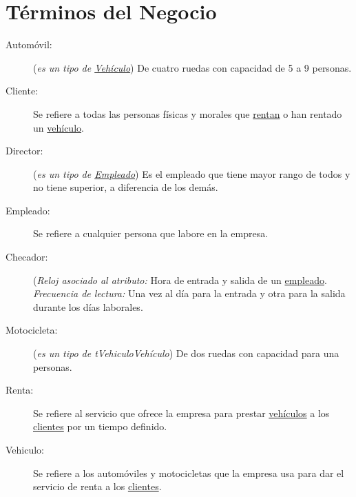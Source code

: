 \section{Términos del Negocio}
\label{sec:terminosDeNegocio}

	
\begin{description}
	\item[\hypertarget{tAutomovil}{Automóvil:}] ({\em es un tipo de \hyperlink{tVehiculo}{Vehículo}}) De cuatro ruedas con capacidad de 5 a 9 personas. 
	\item[\hypertarget{tCliente}{Cliente:}] Se refiere a todas las personas físicas y morales que \hyperlink{tRenta}{rentan} o han rentado un \hyperlink{tVehiculo}{vehículo}.
	
	\item[\hypertarget{tDirector}{Director:}] ({\em es un tipo de \hyperlink{tEmpleado}{Empleado}}) Es el empleado que tiene mayor rango de todos y no tiene superior, a diferencia de los demás.	
	\item[\hypertarget{tEmpleado}{Empleado:}] Se refiere a cualquier persona que labore en la empresa.
	
	\item[\hypertarget{tChecador}{Checador:}] ({\em Reloj asociado al atributo:} Hora de entrada y salida de un \hyperlink{tEmpleado}{empleado}. {\em Frecuencia de lectura:} Una vez al día para la entrada y otra para la salida durante los días laborales.
	
	\item[\hypertarget{tMotocicleta}{Motocicleta:}] ({\em es un tipo de {tVehiculo}{Vehículo}}) De dos ruedas con capacidad para una personas. 

	\item[\hypertarget{tRenta}{Renta:}] Se refiere al servicio que ofrece la empresa para prestar \hyperlink{tVehiculo}{vehículos} a los \hyperlink{tCliente}{clientes} por un tiempo definido.
	
	\item[\hypertarget{tVehiculo}{Vehiculo:}] Se refiere a los automóviles y motocicletas que la empresa usa para dar el servicio de renta a los \hyperlink{tCliente}{clientes}.
	
\end{description}

